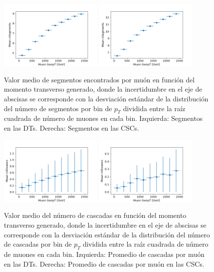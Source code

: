\begin{figure}[h!]
\centering
\includegraphics[width=0.45\textwidth]{figures/data_genpt_DT_MeanNSegments.png}
\includegraphics[width=0.45\textwidth]{figures/data_genpt_CSC_MeanNSegments.png}
\caption{Valor medio de segmentos encontrados por mu\'on en funci\'on del momento transverso generado, donde la incertidumbre en el eje de abscisas se corresponde con la desviación est\'andar de la distribuci\'on del n\'umero de segmentos por bin de $p_{T}$ dividida entre la ra\'iz cuadrada de n\'umero de muones en cada bin. Izquierda: Segmentos en las DTs. Derecha: Segmentos en las CSCs.}
\label{fig:data_nSegmentsMean}        
\end{figure}

\begin{figure}[h!]
\centering
\includegraphics[width=0.45\textwidth]{figures/data_genpt_DT_MeanNshowers.png}
\includegraphics[width=0.45\textwidth]{figures/data_genpt_CSC_MeanNshowers.png}
\caption{Valor medio del n\'umero de cascadas en funci\'on del momento transverso generado, donde la incertidumbre en el eje de abscisas se corresponde con la desviación est\'andar de la distribuci\'on del n\'umero de cascadas por bin de $p_{T}$ dividida entre la ra\'iz cuadrada de n\'umero de muones en cada bin. Izquierda: Promedio de cascadas por mu\'on en las DTs. Derecha: Promedio de cascadas por mu\'on en las CSCs.}
\label{fig:data_nShowersMean_genpt}        
\end{figure}

